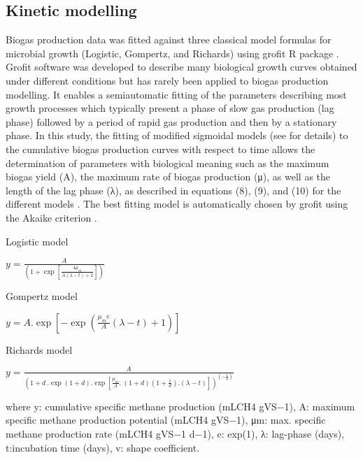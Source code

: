 \subsection{Kinetic modelling}
Biogas production data was fitted against three classical model formulas for microbial growth (Logistic, Gompertz, and Richards) using grofit R package \cite{Kahm_2010}. Grofit software was developed to describe many biological growth curves obtained under different conditions but has rarely been applied to biogas production modelling. It enables a semiautomatic fitting of the parameters describing most growth processes which typically present a phase of slow gas production (lag phase) followed by a period of rapid gas production and then by a stationary phase. In this study, the fitting of modified sigmoidal models (see \cite{Zwietering1990} for details) to the cumulative biogas production curves with respect to time allows the determination of parameters with biological meaning such as the maximum biogas yield (A), the maximum rate of biogas production (μ), as well as the length of the lag phase (λ), as described in equations (8), (9), and (10) for the different models \cite{Zwietering1990,Ware_2017,Alta__2009}. The best fitting model is automatically chosen by grofit using the Akaike criterion \cite{Hasenbrink_2006}.

Logistic model

\(y=\frac{A}{\left(1+\exp\left[\frac{4\mu_m}{A\left(\lambda-t\right)+2}\right]\right)}\)

Gompertz model

\(y=A.\exp\left[-\exp\left(\frac{\mu_me}{A}\left(\lambda-t\right)+1\right)\right]\)

Richards model

\(y=\frac{A}{\left(1+d\ .\exp\left(1+d\right).\exp\left[\frac{\mu_m}{A}.\ \left(1+d\right)\left(1+\frac{1}{d}\right).\left(\lambda-t\right)\right]\right)^{\left(-\frac{1}{d}\right)}}\)

where y: cumulative specific methane production (mLCH4 gVS−1), A: maximum specific methane production potential (mLCH4 gVS−1), μm: max. specific methane production rate (mLCH4 gVS−1 d−1), e: exp(1), λ: lag-phase (days), t:incubation time (days), v: shape coefficient.